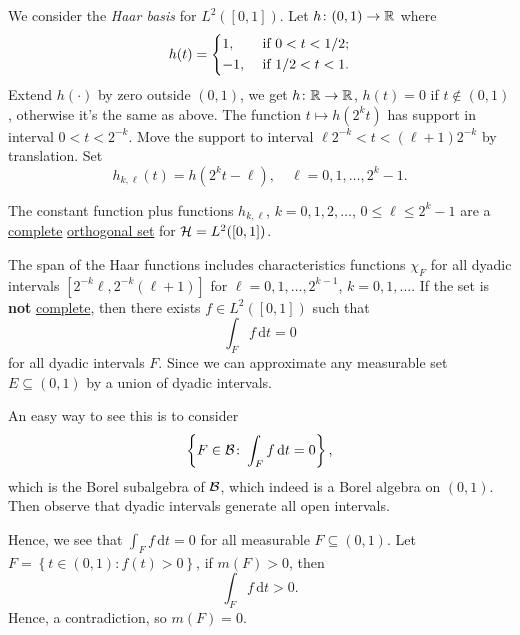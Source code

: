 \begin{eg}
	We consider the \emph{Haar basis} for \(L^2([0, 1])\). Let \(h\colon (0, 1)\to \mathbb{\MakeUppercase{r}} \) where
	\[
		h(t) = \begin{dcases}
			1,  & \text{ if } 0 < t < 1 / 2; \\
			-1, & \text{ if } 1 / 2 < t < 1.
		\end{dcases}
	\]
	Extend \(h(\cdot)\) by zero outside \((0, 1)\), we get \(h\colon \mathbb{\MakeUppercase{r}} \to \mathbb{\MakeUppercase{r}} \), \(h(t) = 0\) if \(t \notin (0, 1)\), otherwise it's the same as above. The function \(t\mapsto h(2^k t)\) has support in interval \(0 < t < 2^{-k}\). Move the support to interval \(\ell 2^{-k} < t < (\ell +1)2^{-k}\) by translation. Set
	\[
		h_{k, \ell }(t) = h(2^{k}t - \ell ),\quad \ell = 0, 1, \ldots , 2^k - 1.
	\]

	The constant function plus functions \(h_{k, \ell }\), \(k = 0, 1, 2, \ldots  \), \(0 \leq \ell \leq 2^k - 1\) are a \hyperref[def:complete-system]{complete} \hyperref[def:orthogonal-system]{orthogonal set} for \(\mathcal{\MakeUppercase{h}} = L^2([0, 1])\).
\end{eg}
\begin{explanation}
	The span of the Haar functions includes characteristics functions \(\chi _F\) for all dyadic intervals \([2^{-k}\ell , 2^{-k}(\ell +1)]\) for \(\ell = 0, 1, \ldots  , 2^{k-1} \), \(k = 0, 1, \ldots\). If the set is \textbf{not} \hyperref[def:complete-system]{complete}, then there exists \(f\in L^2([0, 1])\) such that
	\[
		\int _F f\,\mathrm{d} t = 0
	\]
	for all dyadic intervals \(F\). Since we can approximate any measurable set \(E\subseteq (0, 1)\) by a union of dyadic intervals.
	\begin{intuition}
		An easy way to see this is to consider
		\[
			\left\{ F\in \mathcal{\MakeUppercase{b}} \colon \int _F f\,\mathrm{d} t = 0 \right\},
		\]
		which is the Borel subalgebra of \(\mathcal{\MakeUppercase{b}} \), which indeed is a Borel algebra on \((0, 1)\). Then observe that dyadic intervals generate all open intervals.
	\end{intuition}

	Hence, we see that \(\int _F f\,\mathrm{d} t= 0\) for all measurable \(F\subseteq (0, 1)\). Let \(F = \left\{ t\in (0, 1)\colon f(t) > 0 \right\} \), if \(m(F) > 0\), then
	\[
		\int _F f\,\mathrm{d} t > 0.
	\]
	Hence, a contradiction, so \(m(F) = 0\).
\end{explanation}

